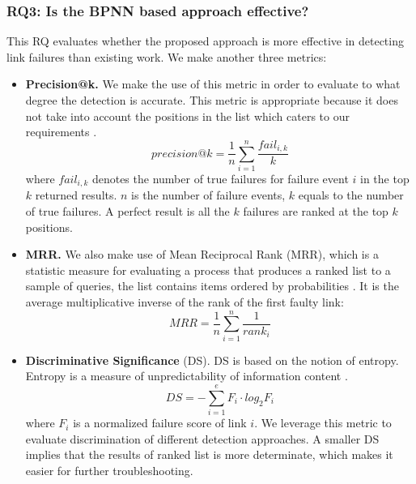\documentclass{sig-alternate-05-2015}
\begin{document}
\subsubsection*{RQ3: Is the BPNN based approach effective?}
\quad This RQ evaluates whether the proposed approach is more effective in detecting link failures than existing work. We make another three metrics:
\begin{itemize}
    \item \textbf{Precision@k.} We make the use of this metric in order to evaluate to what degree the detection is accurate. This metric is appropriate because it does not take into account the positions in the list which caters to our requirements \cite{mogotsi2010christopher}.
    \begin{equation}
        precision@k = \frac{1}{n}\sum_{i=1}^n \frac{fail_{i,k}}{k}
    \end{equation}
    where $fail_{i,k}$ denotes the number of true failures for failure event $i$ in the top $k$ returned results. $n$ is the number of failure events, $k$ equals to the number of true failures. A perfect result is all the $k$ failures are ranked at the top $k$ positions.

    \item \textbf{MRR.} We also make use of Mean Reciprocal Rank (MRR), which is a statistic measure for evaluating a process that produces a ranked list to a sample of queries, the list contains items ordered by probabilities \cite{radev2002evaluating}. It is the average multiplicative inverse of the rank of the first faulty link:
        \begin{equation}
            MRR = \frac{1}{n}\sum_{i=1}^n \frac{1}{rank_i}
        \end{equation}

    \item \textbf{Discriminative Significance} (DS). DS is based on the notion of entropy. Entropy is a measure of unpredictability of information content \cite{shannon2001mathematical}.
        \begin{equation}
            DS = -\sum_{i=1}^e F_i \cdot log_2 F_i
        \end{equation}
        where $F_i$ is a normalized failure score of link $i$. We leverage this metric to evaluate discrimination of different detection approaches. A smaller DS implies that the results of ranked list is more determinate, which makes it easier for further troubleshooting.


\end{itemize}
\end{document}
